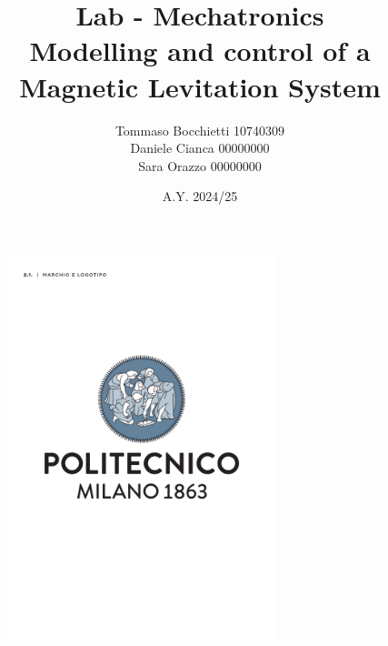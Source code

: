 \documentclass[draft=false]{assignment}
\begin{document}
\title{Lab - Mechatronics \\ Modelling and control of a Magnetic Levitation System}
\author{Tommaso Bocchietti 10740309 \\ Daniele Cianca 00000000 \\ Sara Orazzo 00000000}
\date{A.Y. 2024/25}

\maketitle

\begin{figure}[H]
    \centering
    \includegraphics[width=0.7\textwidth]{./pdf/Polimi_logo_coverpage.pdf}
    \label{fig:Polimi_logo}
\end{figure}

\clearpage
\tableofcontents
\listoffigures
\listoftables
\lstlistoflistings
\printnoidxglossaries

\clearpage


\clearpage


\clearpage


\clearpage





\clearpage



\clearpage

\end{document}
